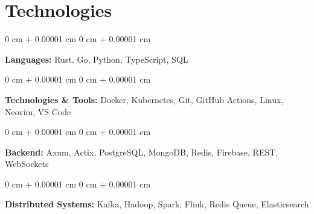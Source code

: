 \documentclass[10pt, letterpaper]{article}
\newenvironment{onecolentry}{
    \begin{adjustwidth}{
        0 cm + 0.00001 cm
    }{
        0 cm + 0.00001 cm
    }
}{
    \end{adjustwidth}
} %
\begin{document}
\section{Technologies}

\begin{onecolentry}
    \textbf{Languages:} Rust, Go, Python, TypeScript, SQL
\end{onecolentry}

\begin{onecolentry}
    \textbf{Technologies \& Tools:} Docker, Kubernetes, Git, GitHub Actions, Linux, Neovim, VS Code
\end{onecolentry}

\begin{onecolentry}
    \textbf{Backend:} Axum, Actix, PostgreSQL, MongoDB, Redis, Firebase, REST, WebSockets
\end{onecolentry}

\begin{onecolentry}
    \textbf{Distributed Systems:} Kafka, Hadoop, Spark, Flink, Redis Queue, Elasticsearch
\end{onecolentry}
\end{document}
